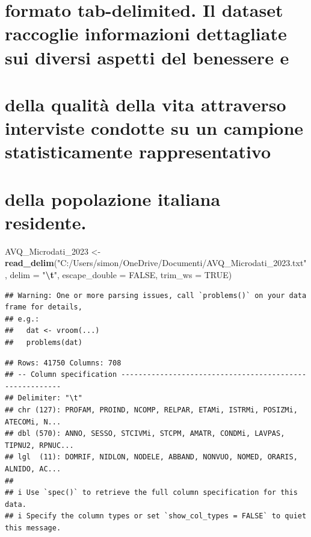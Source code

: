 \documentclass[
]{article}
\newenvironment{Shaded}{\begin{snugshade}}{\end{snugshade}}
\newcommand{\AttributeTok}[1]{\textcolor[rgb]{0.13,0.29,0.53}{#1}}
\newcommand{\ConstantTok}[1]{\textcolor[rgb]{0.56,0.35,0.01}{#1}}
\newcommand{\FunctionTok}[1]{\textcolor[rgb]{0.13,0.29,0.53}{\textbf{#1}}}
\newcommand{\NormalTok}[1]{#1}
\newcommand{\OtherTok}[1]{\textcolor[rgb]{0.56,0.35,0.01}{#1}}
\newcommand{\SpecialCharTok}[1]{\textcolor[rgb]{0.81,0.36,0.00}{\textbf{#1}}}
\newcommand{\StringTok}[1]{\textcolor[rgb]{0.31,0.60,0.02}{#1}}
\begin{document}
\section{formato tab-delimited. Il dataset raccoglie informazioni
dettagliate sui diversi aspetti del benessere
e}\label{formato-tab-delimited.-il-dataset-raccoglie-informazioni-dettagliate-sui-diversi-aspetti-del-benessere-e}

\section{della qualità della vita attraverso interviste condotte su un
campione statisticamente
rappresentativo}\label{della-qualituxe0-della-vita-attraverso-interviste-condotte-su-un-campione-statisticamente-rappresentativo}

\section{della popolazione italiana
residente.}\label{della-popolazione-italiana-residente.}

\begin{Shaded}
\begin{Highlighting}[]
\NormalTok{AVQ\_Microdati\_2023 }\OtherTok{\textless{}{-}} \FunctionTok{read\_delim}\NormalTok{(}\StringTok{"C:/Users/simon/OneDrive/Documenti/AVQ\_Microdati\_2023.txt"}\NormalTok{, }
                                 \AttributeTok{delim =} \StringTok{"}\SpecialCharTok{\textbackslash{}t}\StringTok{"}\NormalTok{, }\AttributeTok{escape\_double =} \ConstantTok{FALSE}\NormalTok{, }\AttributeTok{trim\_ws =} \ConstantTok{TRUE}\NormalTok{)}
\end{Highlighting}
\end{Shaded}

\begin{verbatim}
## Warning: One or more parsing issues, call `problems()` on your data frame for details,
## e.g.:
##   dat <- vroom(...)
##   problems(dat)
\end{verbatim}

\begin{verbatim}
## Rows: 41750 Columns: 708
## -- Column specification --------------------------------------------------------
## Delimiter: "\t"
## chr (127): PROFAM, PROIND, NCOMP, RELPAR, ETAMi, ISTRMi, POSIZMi, ATECOMi, N...
## dbl (570): ANNO, SESSO, STCIVMi, STCPM, AMATR, CONDMi, LAVPAS, TIPNU2, RPNUC...
## lgl  (11): DOMRIF, NIDLON, NODELE, ABBAND, NONVUO, NOMED, ORARIS, ALNIDO, AC...
## 
## i Use `spec()` to retrieve the full column specification for this data.
## i Specify the column types or set `show_col_types = FALSE` to quiet this message.
\end{verbatim}
\end{document}
